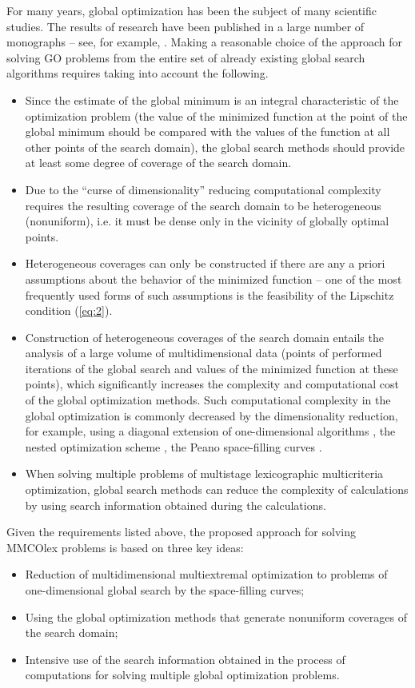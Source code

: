 \documentclass[smallextended]{svjour3}       %
\begin{document}
For many years, global optimization has been the subject of many scientific studies. The results of research have been published in a large number of monographs -- see, for example, \cite{c17,c18,c19,c20,c21,c22,c23,c24,c25}. Making a reasonable choice of the approach for solving GO problems from the entire set of already existing global search algorithms requires taking into account the following.
\begin{itemize}
	\item Since the estimate of the global minimum is an integral characteristic of the optimization problem (the value of the minimized function at the point of the global minimum should be compared with the values of the function at all other points of the search domain), the global search methods should provide at least some degree of coverage of the search domain.
	\item Due to the ``curse of dimensionality'' reducing computational complexity requires the resulting coverage of the search domain to be heterogeneous (nonuniform), i.e. it must be dense only in the vicinity of globally optimal points.
	\item Heterogeneous coverages can only be constructed if there are any a priori assumptions about the behavior of the minimized function -- one of the most frequently used forms of such assumptions is the feasibility of the Lipschitz condition (\ref{eq:2}).
	\item Construction of heterogeneous coverages of the search domain entails the analysis of a large volume of multidimensional data (points of performed iterations of the global search and values of the minimized function at these points), which significantly increases the complexity and computational cost of the global optimization methods. Such computational complexity in the global optimization is commonly decreased by the dimensionality reduction, for example, using a diagonal extension of one-dimensional algorithms \cite{c22,c45}, the nested optimization scheme \cite{c46,c47}, the Peano space-filling curves \cite{c17,c23}.
	\item When solving multiple problems of multistage lexicographic multicriteria optimization, global search methods can reduce the complexity of calculations by using search information obtained during the calculations.
\end{itemize}

Given the requirements listed above, the proposed approach for solving MMCOlex problems is based on three key ideas:
\begin{itemize}
	\item Reduction of multidimensional multiextremal optimization to problems of one-dimensional global search by the space-filling curves;
	\item Using the global optimization methods that generate nonuniform coverages of the search domain;
	\item Intensive use of the search information obtained in the process of computations for solving multiple global optimization problems.
\end{itemize}
\end{document}
